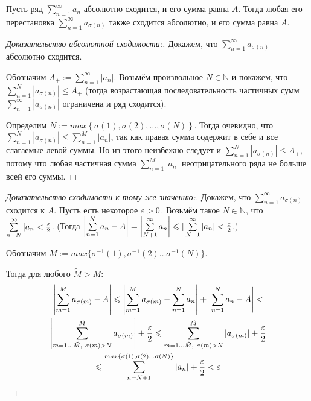 \documentclass[a4paper, 12pt]{article}
\begin{document}
	\begin{Theorem}[Коши]
		Пусть ряд $\sum\limits_{n=1}^{\infty}a_n$ абсолютно сходится, и его сумма равна $A$. Тогда любая его перестановка $\sum\limits_{n=1}^{\infty}a_{\sigma(n)}$ также сходится абсолютно, и его сумма равна $A$.
	\end{Theorem}
	\begin{proof} [Доказательство абсолютной сходимости:]  Докажем, что $\sum\limits_{n=1}^{\infty}a_{\sigma(n)}$ абсолютно сходится.
			
			Обозначим $A_+ := \sum\limits_{n=1}^{\infty}|a_n|$.
			Возьмём произвольное $N\in \mathbb{N}$ и покажем, что  $\sum\limits_{n=1}^{N}|a_{\sigma(n)}| \leq A_+$ (тогда возрастающая последовательность частичных сумм $\sum\limits_{n=1}^{\infty}|a_{\sigma(n)}|$ ограничена и ряд сходится).

			Определим $N := max \left\{\sigma(1), \sigma(2), \dots, \sigma(N)\right\}$.  Тогда очевидно, что $\sum\limits_{n=1}^{N}|a_{\sigma(n)}| \leq \sum\limits_{n=1}^{M}|a_{n}|$, так как правая сумма содержит в себе и все слагаемые левой суммы. Но из этого неизбежно следует и  $\sum\limits_{n=1}^{N}|a_{\sigma(n)}| \leq A_+$, потому что любая частичная сумма $\sum\limits_{n=1}^{M}|a_{n}|$ неотрицательного ряда не больше всей его суммы.
	\end{proof}
	\begin{proof} [Доказательство сходимости к тому же значению:]		
		 Докажем, что $\sum\limits_{n=1}^{\infty}a_{\sigma(n)}$ сходится к $A$. Пусть есть некоторое $\varepsilon>0$. Возьмём такое $N\in \mathbb{N}$, что $\sum\limits_{n=N}^{\infty}|a_{n} < \frac{\varepsilon}{2}$. (Тогда $\left| \sum\limits_{n=1}^{N}a_{n} - A\right| = \left| \sum\limits_{N+1}^{\infty}a_{n}\right| \leqslant |\sum\limits_{N+1}^{\infty}|a_{n}| < \frac{\varepsilon}{2}$.)
		 
		 Обозначим $M := max\{ \sigma^{-1}(1), \sigma^{-1}(2)\dots \sigma^{-1}(N)\}$.
		 
		 Тогда для любого $\tilde{M}>M$:
		\begin{multline}
		 \left| \sum\limits_{m=1}^{\tilde{M}}a_{\sigma(m)} -A \right|\leqslant \left| \sum\limits_{m=1}^{\tilde{M}}a_{\sigma(m)} - \sum\limits_{n=1}^{N}a_{n} \right| + \left| \sum\limits_{n=1}^{N}a_{n} - A \right| < \\\left| \sum\limits_{m=1\dots \tilde{M},\ \sigma(m)>N }^{\tilde{M}}a_{\sigma(m)}\right| + \frac{\varepsilon}{2} \leqslant   \sum\limits_{m=1\dots \tilde{M},\ \sigma(m)>N }^{\tilde{M}}|a_{\sigma(m)}| + \frac{\varepsilon}{2}\\ \leqslant \sum\limits_{n=N+1}^{max\{ \sigma(1), \sigma(2)\dots \sigma(N)\}}|a_n| + \frac{\varepsilon}{2} < \varepsilon
		 \end{multline}	
	\end{proof}
	
\end{document}
